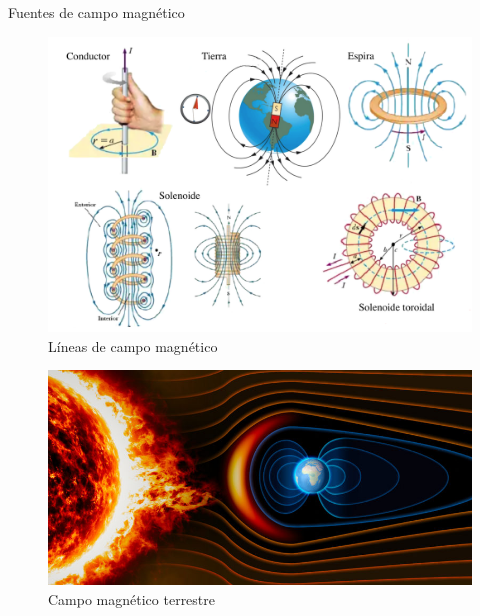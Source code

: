 \newpage %
\begin{myblock}{Fuentes de campo magnético}
	
	\begin{figure}[H]
	\centering
	\includegraphics[width=1\textwidth]{imagenes/imagenes26/T26IM32.png}
	\caption*{Líneas de campo magnético}
	\end{figure}
	
	
	\begin{figure}[H]
	\centering
	\includegraphics[width=1\textwidth]{imagenes/imagenes26/T26IM31.png}
	\caption*{Campo magnético terrestre}
	\end{figure}

\end{myblock}
